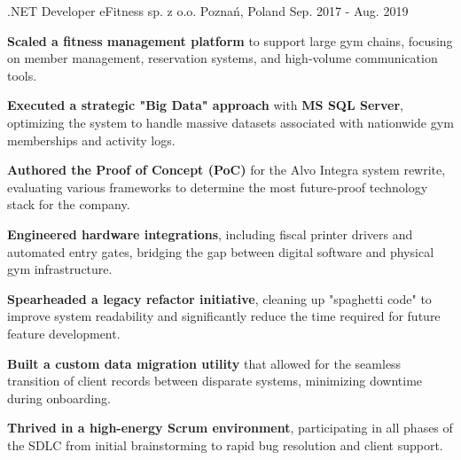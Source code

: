 \begin{cventries}
  \cventry
    {.NET Developer} %
    {eFitness sp. z o.o.} %
    {Poznań, Poland} %
    {Sep. 2017 - Aug. 2019} %
    {
      \begin{cvitems} %
        \item {\textbf{Scaled a fitness management platform} to support large gym chains, focusing on member management, reservation systems, and high-volume communication tools.}
        \item {\textbf{Executed a strategic "Big Data" approach} with \textbf{MS SQL Server}, optimizing the system to handle massive datasets associated with nationwide gym memberships and activity logs.}
        \item {\textbf{Authored the Proof of Concept (PoC)} for the Alvo Integra system rewrite, evaluating various frameworks to determine the most future-proof technology stack for the company.}
        \item {\textbf{Engineered hardware integrations}, including fiscal printer drivers and automated entry gates, bridging the gap between digital software and physical gym infrastructure.}
        \item {\textbf{Spearheaded a legacy refactor initiative}, cleaning up "spaghetti code" to improve system readability and significantly reduce the time required for future feature development.}
        \item {\textbf{Built a custom data migration utility} that allowed for the seamless transition of client records between disparate systems, minimizing downtime during onboarding.}
        \item {\textbf{Thrived in a high-energy Scrum environment}, participating in all phases of the SDLC from initial brainstorming to rapid bug resolution and client support.}
      \end{cvitems}
    }


\end{cventries}
